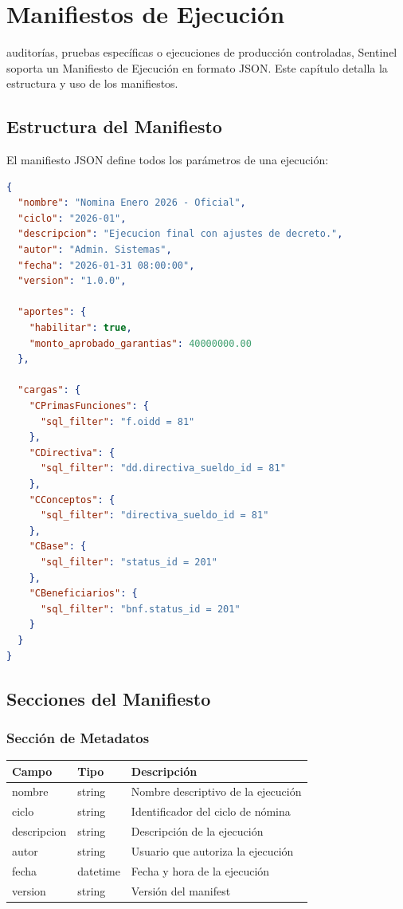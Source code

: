 \chapter{Manifiestos de Ejecución}

 auditorías, pruebas específicas o ejecuciones de producción controladas, Sentinel soporta un Manifiesto de Ejecución en formato JSON. Este capítulo detalla la estructura y uso de los manifiestos.

\section{Estructura del Manifiesto}

El manifiesto JSON define todos los parámetros de una ejecución:

\begin{lstlisting}[language=json]
{
  "nombre": "Nomina Enero 2026 - Oficial",
  "ciclo": "2026-01",
  "descripcion": "Ejecucion final con ajustes de decreto.",
  "autor": "Admin. Sistemas",
  "fecha": "2026-01-31 08:00:00",
  "version": "1.0.0",
  
  "aportes": {
    "habilitar": true,
    "monto_aprobado_garantias": 40000000.00
  },
  
  "cargas": {
    "CPrimasFunciones": {
      "sql_filter": "f.oidd = 81"
    },
    "CDirectiva": {
      "sql_filter": "dd.directiva_sueldo_id = 81"
    },
    "CConceptos": {
      "sql_filter": "directiva_sueldo_id = 81"
    },
    "CBase": {
      "sql_filter": "status_id = 201"
    },
    "CBeneficiarios": {
      "sql_filter": "bnf.status_id = 201"
    }
  }
}
\end{lstlisting}

\section{Secciones del Manifiesto}

\subsection{Sección de Metadatos}

\begin{center}
\begin{tabular}{llp{8cm}}
\toprule
\textbf{Campo} & \textbf{Tipo} & \textbf{Descripción} \\
\midrule
nombre & string & Nombre descriptivo de la ejecución \\
ciclo & string & Identificador del ciclo de nómina \\
descripcion & string & Descripción de la ejecución \\
autor & string & Usuario que autoriza la ejecución \\
fecha & datetime & Fecha y hora de la ejecución \\
version & string & Versión del manifest \\
\bottomrule
\end{tabular}
\end{center}

